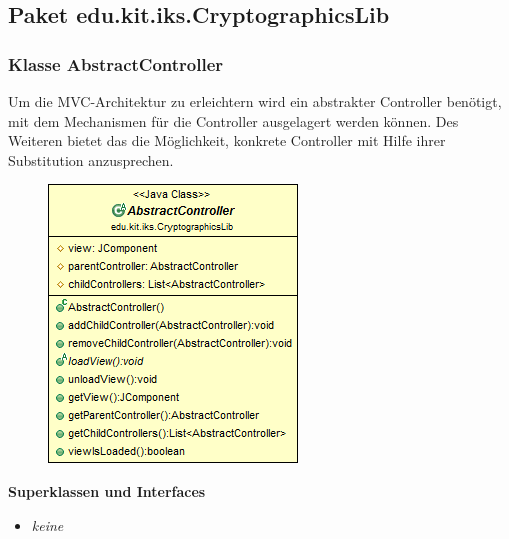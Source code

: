 \documentclass{article}
\begin{document}
  \subsection{Paket edu.kit.iks.CryptographicsLib}
    
  	\subsubsection{Klasse AbstractController}
	  Um die MVC-Architektur zu erleichtern wird ein abstrakter Controller benötigt, mit dem Mechanismen
	  für die Controller ausgelagert werden können. Des Weiteren bietet das die Möglichkeit, konkrete
	  Controller mit Hilfe ihrer Substitution anzusprechen.
	
      \begin{figure}[H]
        \centering
        \includegraphics[width=\textwidth]{resources/edu-kit-iks-CryptographicsLib-AbstractController}
      \end{figure}
	
      \textbf{Superklassen und Interfaces}
      \begin{itemize}
        \item \textit{keine}
      \end{itemize}
	
\end{document}
